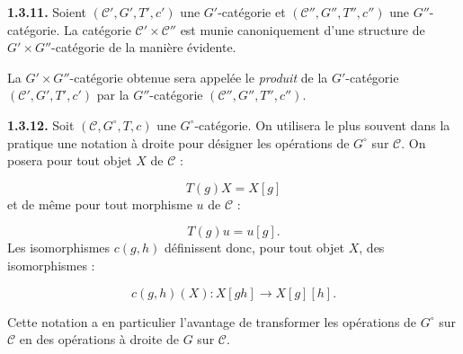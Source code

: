 \noindent\textbf{1.3.11.}\quad
Soient $(\mathcal C',G',T',c')$ une $G'$-catégorie et
$(\mathcal C'',G'',T'',c'')$ une $G''$-catégorie. La catégorie
$\mathcal C'\times\mathcal C''$ est munie canoniquement d'une structure
de $G'\times G''$-catégorie de la manière évidente.

La $G'\times G''$-catégorie obtenue sera appelée le \emph{produit} de
la $G'$-catégorie $(\mathcal C',G',T',c')$ par la $G''$-catégorie
$(\mathcal C'',G'',T'',c'')$.

\noindent\textbf{1.3.12.}\quad
Soit $(\mathcal C,G^\circ,T,c)$ une $G^\circ$-catégorie. On utilisera
le plus souvent dans la pratique une notation à droite pour désigner
les opérations de $G^\circ$ sur $\mathcal C$. On posera pour tout objet
$X$ de $\mathcal C$ :

\begin{equation}
  T(g)X=X[g]
  \tag{1.3.12.1}
\end{equation}
et de même pour tout morphisme $u$ de $\mathcal C$ :

\begin{equation}
  T(g)u=u[g].
  \tag{1.3.12.2}
\end{equation}
Les isomorphismes $c(g,h)$ définissent donc, pour tout objet $X$, des
isomorphismes :

\begin{equation}
  c(g,h)(X)\colon X[gh]\longrightarrow X[g][h].
  \tag{1.3.12.3}
\end{equation}

Cette notation a en particulier l'avantage de transformer les
opérations de $G^\circ$ sur $\mathcal C$ en des opérations à droite de
$G$ sur $\mathcal C$.
